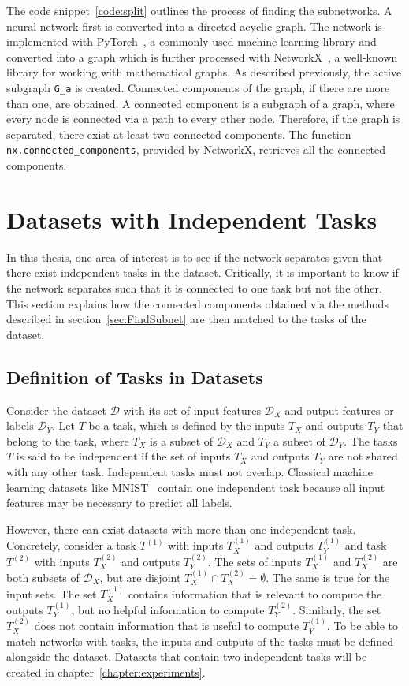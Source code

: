 The code snippet~\ref{code:split} outlines the process of finding the subnetworks.
A neural network first is converted into a directed acyclic graph.
The network is implemented with PyTorch~\autocite{pytorch}, a commonly used machine learning library and converted into a graph which is further processed with NetworkX~\autocite{networkx}, a well-known library for working with mathematical graphs.
As described previously, the active subgraph \lstinline{G_a} is created.
Connected components of the graph, if there are more than one, are obtained.
A connected component is a subgraph of a graph, where every node is connected via a path to every other node.
Therefore, if the graph is separated, there exist at least two connected components.
The function \lstinline{nx.connected_components}, provided by NetworkX, retrieves all the connected components.

\section{Datasets with Independent Tasks}\label{sec:taskmatch}
In this thesis, one area of interest is to see if the network separates given that there exist independent tasks in the dataset.
Critically, it is important to know if the network separates such that it is connected to one task but not the other.
This section explains how the connected components obtained via the methods described in section~\ref{sec:FindSubnet} are then matched to the tasks of the dataset.

\subsection{Definition of Tasks in Datasets}
Consider the dataset $\mathcal{D}$ with its set of input features $\mathcal{D}_X$ and output features or labels $\mathcal{D}_Y$.
Let $T$ be a task, which is defined by the inputs $T_X$ and outputs $T_Y$ that belong to the task, where $T_X$ is a subset of $\mathcal{D}_X$ and $T_Y$ a subset of $\mathcal{D}_Y$.
The tasks $T$ is said to be independent if the set of inputs $T_X$ and outputs $T_Y$ are not shared with any other task.
Independent tasks must not overlap.
Classical machine learning datasets like MNIST~\autocite{mnist} contain one independent task because all input features may be necessary to predict all labels.

However, there can exist datasets with more than one independent task.
Concretely, consider a task $T^{(1)}$ with inputs $T^{(1)}_X$ and outputs $T^{(1)}_Y$ and task $T^{(2)}$ with inputs $T^{(2)}_X$ and outputs $T^{(2)}_Y$.
The sets of inputs $T^{(1)}_X$ and $T^{(2)}_X$ are both subsets of $\mathcal{D}_X$, but are disjoint $T^{(1)}_X \cap T^{(2)}_X = \emptyset$.
The same is true for the input sets.
The set $T^{(1)}_X$ contains information that is relevant to compute the outputs $T^{(1)}_Y$, but no helpful information to compute $T^{(2)}_Y$.
Similarly, the set $T^{(2)}_X$ does not contain information that is useful to compute $T^{(1)}_Y$.
To be able to match networks with tasks, the inputs and outputs of the tasks must be defined alongside the dataset.
Datasets that contain two independent tasks will be created in chapter~\ref{chapter:experiments}.

